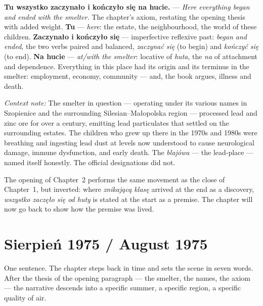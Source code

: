 \textbf{Tu wszystko zaczynało i kończyło się na
hucie.} --- \textit{Here everything began and ended
with the smelter.} The chapter's axiom, restating
the opening thesis with added weight. \textbf{Tu}
--- \textit{here}: the estate, the neighbourhood,
the world of these children. \textbf{Zaczynało i
kończyło się} --- imperfective reflexive past:
\textit{began and ended}, the two verbs paired and
balanced, \textit{zaczynać się} (to begin) and
\textit{kończyć się} (to end). \textbf{Na hucie}
--- \textit{at/with the smelter}: locative of
\textit{huta}, the \textit{na} of attachment and
dependence. Everything in this place had its origin
and its terminus in the smelter: employment, economy,
community --- and, the book argues, illness and death.

\medskip
\noindent\textit{Context note:} The smelter in
question --- operating under its various names in
Szopienice and the surrounding Silesian--Małopolska
region --- processed lead and zinc ore for over a
century, emitting lead particulates that settled on
the surrounding estates. The children who grew up
there in the 1970s and 1980s were breathing and
ingesting lead dust at levels now understood to
cause neurological damage, immune dysfunction, and
early death. The \textit{blajówa} --- the lead-place
--- named itself honestly. The official designations
did not.

\medskip
The opening of Chapter~2 performs the same movement
as the close of Chapter~1, but inverted: where
\textit{znikającą klasę} arrived at the end as a
discovery, \textit{wszystko zaczęło się od huty}
is stated at the start as a premise. The chapter
will now go back to show how the premise was lived.

\section{Sierpień 1975 / August 1975}



One sentence. The chapter steps back in time and sets
the scene in seven words. After the thesis of the
opening paragraph --- the smelter, the names, the
axiom --- the narrative descends into a specific
summer, a specific region, a specific quality of air.


